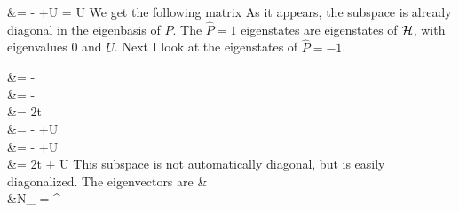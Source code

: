 \documentclass{article}
\begin{document}
&= -\cc{\ket{\downarrow,\uparrow}-\ket{\uparrow,\downarrow}+\ket{\uparrow,\downarrow}-\ket{\downarrow,\uparrow}} +U = U
\eeq
We get the following matrix
\beq
{}
\eeq
As it appears, the subspace is already diagonal in the eigenbasis of \(\hat{P}\). The \(\hat{P} = 1\) eigenstates are eigenstates of \(\mathcal{H}\), with eigenvalues 0 and \(U\). Next I look at the eigenstates of \(\hat{P}=-1\).

\beq
\ham\: &= -  \\
&= - \\
&= 2t \\
\ham\: &= -  +U \\
&= -\cc{\ket{\downarrow,\uparrow}-\ket{\uparrow,\downarrow}-\ket{\uparrow,\downarrow}+\ket{\downarrow,\uparrow}} +U \\
&= 2t + U
\eeq
\beq
{}
\eeq
This subspace is not automatically diagonal, but is easily diagonalized. The eigenvectors are 
\beq
& \\
&N_{\pm} = ^
\eeq
\end{document}
